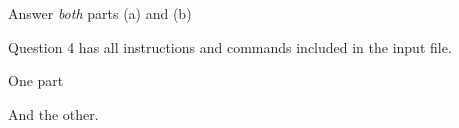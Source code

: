 Answer \emph{both} parts (a) and (b)

Question 4 has all instructions and commands included in the input file.
\qitemsbegin
\item One part 
\item And the other. 
\qitemsend
